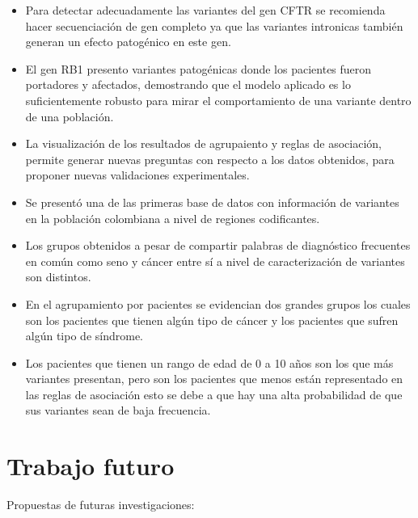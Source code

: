 \begin{itemize}
	\item Para detectar adecuadamente las variantes del gen CFTR se recomienda hacer secuenciación de gen completo ya que las variantes intronicas también generan un efecto patogénico en este gen.
	
	\item El gen RB1 presento variantes patogénicas donde los pacientes fueron portadores y afectados, demostrando que el modelo aplicado es lo suficientemente robusto para mirar el comportamiento de una variante dentro de una población.
	
	\item La visualización de los resultados de agrupaiento  y reglas de asociación, permite generar nuevas preguntas con respecto a los datos obtenidos, para proponer nuevas validaciones experimentales.
	
	\item Se presentó una de las primeras base de datos con información de variantes en la población colombiana a nivel de regiones codificantes.
	
	\item Los grupos obtenidos a pesar de compartir palabras de diagnóstico frecuentes en común como seno y cáncer entre sí a nivel de caracterización de variantes son distintos.
	
	\item En el agrupamiento por pacientes se evidencian dos grandes grupos los cuales son los pacientes que tienen algún tipo de cáncer y los pacientes que sufren algún tipo de síndrome. 
	
	\item Los pacientes que tienen un rango de edad de 0 a 10 años son los que más variantes presentan, pero son los pacientes que menos están representado en las reglas de asociación esto se debe a que hay una alta probabilidad de que sus variantes sean de baja frecuencia. 	
	 
\end{itemize}

\section{Trabajo futuro}

Propuestas de futuras investigaciones:

